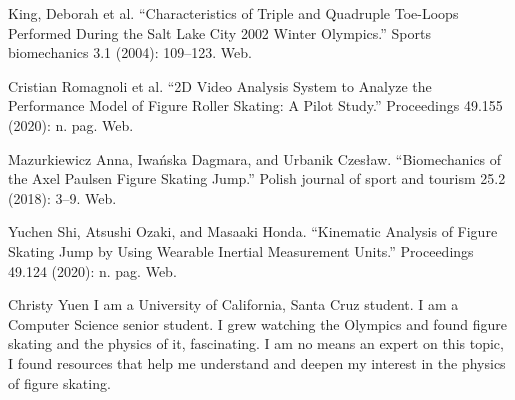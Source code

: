 \documentclass[12pt,journal,compsoc]{IEEEtran}
\begin{document}

\begin{thebibliography}{1}

King, Deborah et al. “Characteristics of Triple and Quadruple Toe-Loops Performed During the Salt Lake City 2002 Winter Olympics.” Sports biomechanics 3.1 (2004): 109–123. Web.

Cristian Romagnoli et al. “2D Video Analysis System to Analyze the Performance Model of Figure Roller Skating: A Pilot Study.” Proceedings 49.155 (2020): n. pag. Web. 

Mazurkiewicz Anna, Iwańska Dagmara, and Urbanik Czesław. “Biomechanics of the Axel Paulsen Figure Skating Jump.” Polish journal of sport and tourism 25.2 (2018): 3–9. Web.

Yuchen Shi, Atsushi Ozaki, and Masaaki Honda. “Kinematic Analysis of Figure Skating Jump by Using Wearable Inertial Measurement Units.” Proceedings 49.124 (2020): n. pag. Web.



\end{thebibliography}

 
\begin{IEEEbiography}
    {Christy Yuen}
I am a University of California, Santa Cruz student. I am a Computer Science senior student. I grew watching the Olympics and found figure skating and the physics of it, fascinating. I am no means an expert on this topic, I found resources that help me understand and deepen my interest in the physics of figure skating. 
\end{IEEEbiography}


\end{document}
